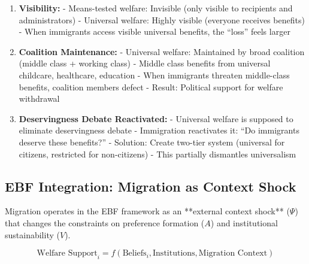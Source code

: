 \begin{enumerate}

\item \textbf{Visibility:}
   - Means-tested welfare: Invisible (only visible to recipients and administrators)
   - Universal welfare: Highly visible (everyone receives benefits)
   - When immigrants access visible universal benefits, the ``loss'' feels larger

\item \textbf{Coalition Maintenance:}
   - Universal welfare: Maintained by broad coalition (middle class + working class)
   - Middle class benefits from universal childcare, healthcare, education
   - When immigrants threaten middle-class benefits, coalition members defect
   - Result: Political support for welfare withdrawal

\item \textbf{Deservingness Debate Reactivated:}
   - Universal welfare is supposed to eliminate deservingness debate
   - Immigration reactivates it: ``Do immigrants deserve these benefits?''
   - Solution: Create two-tier system (universal for citizens, restricted for non-citizens)
   - This partially dismantles universalism

\end{enumerate}

\subsection{EBF Integration: Migration as Context Shock}

Migration operates in the EBF framework as an **external context shock** ($\Psi$) that changes the constraints on preference formation ($A$) and institutional sustainability ($V$).

\begin{equation}
\text{Welfare Support}_i = f(\text{Beliefs}_i, \text{Institutions}, \text{Migration Context})
\end{equation}

